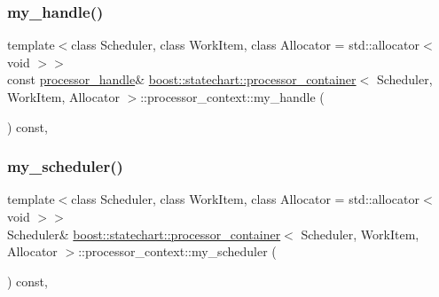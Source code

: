 \subsubsection{\texorpdfstring{my\+\_\+handle()}{my\_handle()}}
{\footnotesize\ttfamily template$<$class Scheduler, class Work\+Item, class Allocator = std\+::allocator$<$ void $>$$>$ \\
const \mbox{\hyperlink{classboost_1_1statechart_1_1processor__container_a82ebbffaed81d7b99119ae0e892f6411}{processor\+\_\+handle}}\& \mbox{\hyperlink{classboost_1_1statechart_1_1processor__container}{boost\+::statechart\+::processor\+\_\+container}}$<$ Scheduler, Work\+Item, Allocator $>$\+::processor\+\_\+context\+::my\+\_\+handle (\begin{DoxyParamCaption}{ }\end{DoxyParamCaption}) const\hspace{0.3cm}{\ttfamily [inline]}, {\ttfamily [private]}}

\mbox{\label{classboost_1_1statechart_1_1processor__container_1_1processor__context_a8a45613f4b0452ad6abb59a3f23010db}} 
\subsubsection{\texorpdfstring{my\+\_\+scheduler()}{my\_scheduler()}}
{\footnotesize\ttfamily template$<$class Scheduler, class Work\+Item, class Allocator = std\+::allocator$<$ void $>$$>$ \\
Scheduler\& \mbox{\hyperlink{classboost_1_1statechart_1_1processor__container}{boost\+::statechart\+::processor\+\_\+container}}$<$ Scheduler, Work\+Item, Allocator $>$\+::processor\+\_\+context\+::my\+\_\+scheduler (\begin{DoxyParamCaption}{ }\end{DoxyParamCaption}) const\hspace{0.3cm}{\ttfamily [inline]}, {\ttfamily [private]}}

\mbox{\label{classboost_1_1statechart_1_1processor__container_1_1processor__context_a82c0887c5327c4357c187549152e3811}} 
